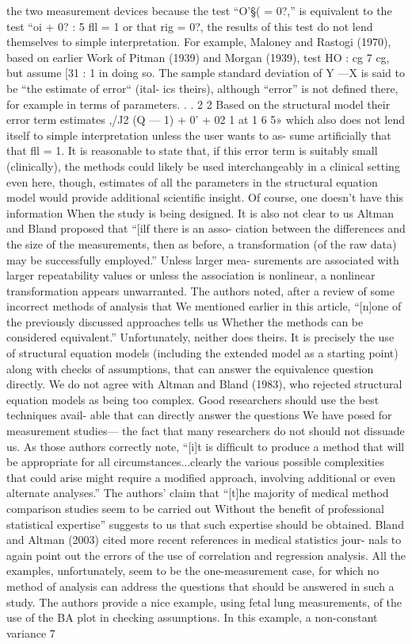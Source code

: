 the two measurement devices because the test “O'§( = 0?,” is equivalent to the test
“oi + 0? : 5%
ﬂl = 1 or that rig = 0?, the results of this test do not lend themselves to simple
interpretation. For example, Maloney and Rastogi (1970), based on earlier Work of
Pitman (1939) and Morgan (1939), test HO : cg 7 cg, but assume [31 : 1 in doing so.
The sample standard deviation of Y —X is said to be “the estimate of error“ (ital-
ics theirs), although “error” is not deﬁned there, for example in terms of parameters.
. . 2 2
Based on the structural model their error term estimates ,/J2 (Q — 1) + 0' + 02
1 at 1 6 5»
which also does not lend itself to simple interpretation unless the user wants to as-
sume artiﬁcially that that ﬂl = 1. It is reasonable to state that, if this error term
is suitably small (clinically), the methods could likely be used interchangeably in a
clinical setting even here, though, estimates of all the parameters in the structural
equation model would provide additional scientiﬁc insight. Of course, one doesn’t
have this information When the study is being designed.
It is also not clear to us Altman and Bland proposed that “[ilf there is an asso-
ciation between the differences and the size of the measurements, then as before, a
transformation (of the raw data) may be successfully employed.” Unless larger mea-
surements are associated with larger repeatability values or unless the association is
nonlinear, a nonlinear transformation appears unwarranted.
The authors noted, after a review of some incorrect methods of analysis that We
mentioned earlier in this article, “[n]one of the previously discussed approaches tells
us Whether the methods can be considered equivalent.” Unfortunately, neither does
theirs. It is precisely the use of structural equation models (including the extended
model as a starting point) along with checks of assumptions, that can answer the
equivalence question directly.
We do not agree with Altman and Bland (1983), who rejected structural equation
models as being too complex. Good researchers should use the best techniques avail-
able that can directly answer the questions We have posed for measurement studies—
the fact that many researchers do not should not dissuade us. As those authors
correctly note, “[i]t is difﬁcult to produce a method that will be appropriate for all
circumstances...clearly the various possible complexities that could arise might require
a modiﬁed approach, involving additional or even alternate analyses.” The authors’
claim that “[t]he majority of medical method comparison studies seem to be carried
out Without the beneﬁt of professional statistical expertise” suggests to us that such
expertise should be obtained.
Bland and Altman (2003) cited more recent references in medical statistics jour-
nals to again point out the errors of the use of correlation and regression analysis.
All the examples, unfortunately, seem to be the one-measurement case, for which
no method of analysis can address the questions that should be answered in such a
study. The authors provide a nice example, using fetal lung measurements, of the
use of the BA plot in checking assumptions. In this example, a non-constant variance
7



